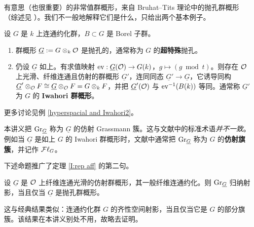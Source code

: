 有意思（也很重要）的非常值群概形，来自 Bruhat--Tits 理论中的抛孔群概形（综述见 \cite{Ti}）。我们不一般地解释它们是什么，只给出两个基本例子。

\begin{ex}\label{hyperspacial and Iwahori}
设 $G$ 是 $k$ 上连通约化群，$B\subset G$ 是 Borel 子群。
\begin{enumerate}
\item 群概形 $\underline G:=G\otimes_k {\mathcal O}$ 是抛孔的，通常称为 $G$ 的\textbf{超特殊}抛孔。
\item 仍设 $\underline G$ 如上。有求值映射 $\operatorname{ev}: \underline G({\mathcal O})\to G(k)$，$g\mapsto (g\bmod t)$。则存在 ${\mathcal O}$ 上光滑、纤维连通且仿射的群概形 $\underline G'$，连同同态 $\underline G'\to \underline G$，它诱导同构 $\underline G'\otimes_{{\mathcal O}}F\cong \underline G\otimes_{\mathcal O} F=G\otimes_k F$，并把 $\underline G'({\mathcal O})$ 与 $\operatorname{ev}^{-1}(B(k))$ 等同。通常称 $\underline G'$ 为 $G$ 的 \textbf{Iwahori 群概形}。
\end{enumerate}
更多讨论见例 \ref{hyperspacial and Iwahori2}。
\end{ex}

\begin{rmk}\label{terminology}
本讲义把 ${\operatorname{Gr}}_{\underline G}$ 称为 $\underline G$ 的仿射 Grassmann 簇。这与文献中的标准术语\emph{并不一致}。例如当 $\underline G$ 是如上 $G$ 的 Iwahori 群概形时，文献中通常把 ${\operatorname{Gr}}_{\underline G}$ 称为 $G$ 的\textbf{仿射旗簇}，并记作 ${{\mathcal F}\ell}_{G}$。
\end{rmk}

下述命题推广了定理 \ref{I:rep aff} 的第二句。

\begin{prop}\label{indproper}
设 $\underline G$ 是 ${\mathcal O}$ 上纤维连通光滑的仿射群概形，其一般纤维连通约化。则 ${\operatorname{Gr}}_{\underline G}$ 归纳射影，当且仅当 $\underline G$ 是抛孔群概形。
\end{prop}

这与经典结果类似：连通约化群 $G$ 的齐性空间射影，当且仅当它是 $G$ 的部分旗簇。该结果在本讲义别处不用，故略去证明。

